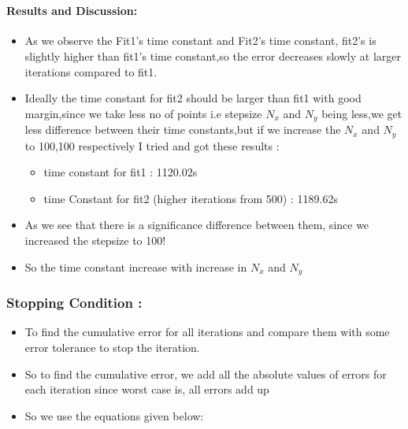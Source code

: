 \documentclass[11pt]{article}
\providecommand{\tightlist}{%
      \setlength{\itemsep}{0pt}\setlength{\parskip}{0pt}}
\begin{document}
	

	

    \begin{center}
    \end{center}
    { \hspace*{\fill} \\}
    
	
		
    \paragraph{Results and Discussion:}\label{results-and-discussion}

\begin{itemize}
\tightlist
\item
  As we observe the Fit1's time constant and Fit2's time constant,
  fit2's is slightly higher than fit1's time constant,so the error
  decreases slowly at larger iterations compared to fit1.
\item
  Ideally the time constant for fit2 should be larger than fit1 with
  good margin,since we take less no of points i.e stepsize \(N_x\) and
  \(N_y\) being less,we get less difference between their time
  constants,but if we increase the \(N_x\) and \(N_y\) to 100,100
  respectively I tried and got these results :

  \begin{itemize}
  \tightlist
  \item
    time constant for fit1 : 1120.02s
  \item
    time Constant for fit2 (higher iterations from 500) : 1189.62s
  \end{itemize}
\item
  As we see that there is a significance difference between them, since
  we increased the stepsize to 100!
\item
  So the time constant increase with increase in \(N_x\) and \(N_y\)
\end{itemize}

	

	
		
    \subsubsection{Stopping Condition :}\label{stopping-condition}

\begin{itemize}
\tightlist
\item
  To find the cumulative error for all iterations and compare them with
  some error tolerance to stop the iteration.
\item
  So to find the cumulative error, we add all the absolute values of
  errors for each iteration since worst case is, all errors add up
\item
  So we use the equations given below:
\end{itemize}
\end{document}
